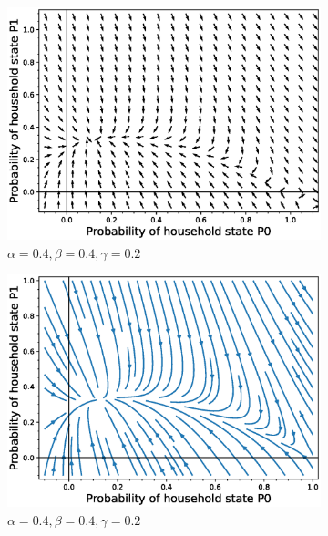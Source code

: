 \documentclass[paper=a4, fontsize=11pt, twoside, BCOR=12mm, parskip=full, listof=totoc]{scrreprt}
\begin{document}
{\begin{figure}[H]
\begin{subfigure}[b]{0.4\linewidth}
      \includegraphics[width=\linewidth]{phase_portrait/032_g11.eps}
	  \caption{\(\alpha=0.4, \beta=0.4, \gamma=0.2\)}
	  \label{beta four phasevectorfield}
	\end{subfigure}
	  \begin{subfigure}[b]{0.4\linewidth}
      \includegraphics[width=\linewidth]{phase_portrait/032_g11s.eps}
	  \caption{\(\alpha=0.4, \beta=0.4, \gamma=0.2\)}
	  \label{beta four phasestreamplot}
	\end{subfigure}
	\begin{subfigure}[b]{0.4\linewidth}

\end{subfigure}
\end{figure}}
\end{document}

